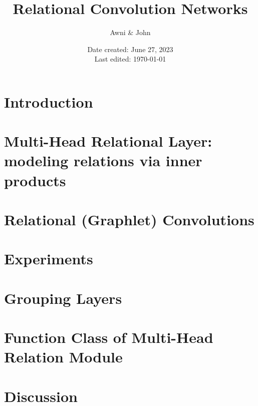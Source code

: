 \documentclass{article}
\title{Relational Convolution Networks}
\author{Awni \& John}
\date{Date created: June 27, 2023\\Last edited: \today}
\begin{document}
\maketitle

\section{Introduction}


\section{Multi-Head Relational Layer: modeling relations via inner products}


\section{Relational (Graphlet) Convolutions}


\section{Experiments}


\section{Grouping Layers}


\section{Function Class of Multi-Head Relation Module}


\section{Discussion}


\printbibliography
\end{document}

